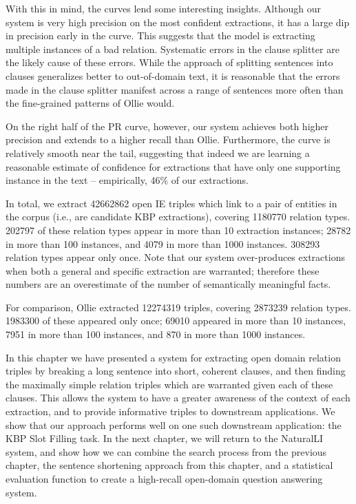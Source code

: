 With this in mind, the curves lend some interesting insights.
Although our system is very high precision on the most confident extractions,
  it has a large dip in precision early in the curve.
This suggests that the model is extracting multiple instances of a bad
  relation.
Systematic errors in the clause splitter are the likely cause of these errors.
While the approach of splitting sentences into clauses generalizes better
  to out-of-domain text, it is reasonable that the errors made in the
  clause splitter manifest across a range of sentences more often than
  the fine-grained patterns of Ollie would.

On the right half of the PR curve, however, our system achieves both higher precision
  and extends to a higher recall than Ollie.
Furthermore, the curve is relatively smooth near the tail, suggesting
  that indeed we are learning a reasonable estimate of confidence for
  extractions that have only one supporting instance in the text
  -- empirically, 46\% of our extractions.

In total, we extract \num{42662862} open IE triples which link to a pair
  of entities in the corpus (i.e., are candidate KBP extractions),
  covering \num{1180770} relation types.
\num{202797} of these relation types appear in more than 10 extraction instances;
  \num{28782} in more than 100 instances, and \num{4079} in more than 1000 instances.
\num{308293} relation types appear only once.
Note that our system
  over-produces extractions when both a general and specific extraction are
  warranted; therefore these numbers are an overestimate of the number
  of semantically meaningful facts.

For comparison, Ollie extracted \num{12274319} triples, covering
  \num{2873239} relation types.
\num{1983300} of these appeared only once;
  \num{69010} appeared in more than 10 instances, \num{7951} in more than 100
  instances, and \num{870} in more than 1000 instances.
    

In this chapter we have presented a system for extracting open domain relation triples
  by breaking a long sentence into short, coherent clauses, and then
  finding the maximally simple relation triples which are warranted given
  each of these clauses.
This allows the system to have a greater awareness of the context of each
  extraction, and to provide informative triples to downstream applications.
We show that our approach performs well on one such downstream application:
  the KBP Slot Filling task.
In the next chapter, we will return to the NaturalLI system, and show how we can
  combine the search process from the previous chapter, the sentence shortening
  approach from this chapter, and a statistical evaluation function to create
  a high-recall open-domain question answering system.





